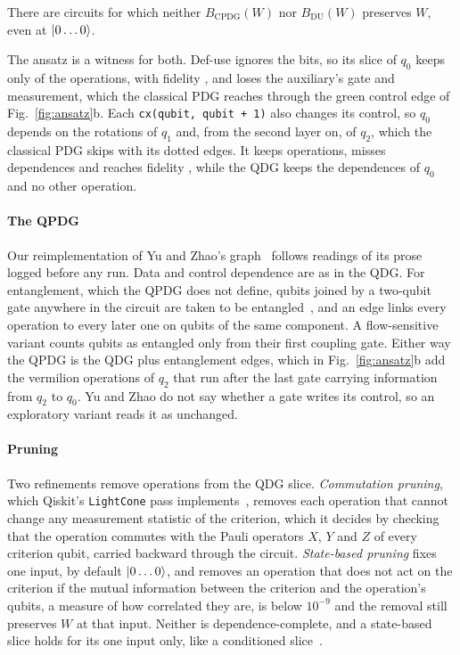 \begin{proposition}\label{prop:du}
There are circuits for which neither $B_{\mathrm{CPDG}}(W)$ nor $B_{\mathrm{DU}}(W)$ preserves $W$, even at
$\lvert 0\dots0\rangle$.
\end{proposition}

The ansatz is a witness for both. Def-use ignores the bits, so its slice of $q_0$ keeps only \numAnsDuOps{} of the
\numAnsOps{} operations, with fidelity \numAnsDuFidelity{}, and loses the auxiliary's gate and measurement, which the
classical PDG reaches through the green control edge of Fig.~\ref{fig:ansatz}b. Each \texttt{cx(qubit, qubit + 1)}
also changes its control, so $q_0$ depends on the rotations of $q_1$ and, from the second layer on, of $q_2$, which
the classical PDG skips with its dotted edges. It keeps \numAnsCpdgOps{} operations, misses \numAnsCpdgMissed{}
dependences and reaches fidelity \numAnsCpdgFidelity{}, while the QDG keeps the \numAnsWireOps{} dependences of $q_0$
and no other operation.

\paragraph*{The QPDG}
Our reimplementation of Yu and Zhao's graph~\cite{yu2025qpdg} follows readings of its prose logged before any run.
Data and control dependence are as in the QDG. For entanglement, which the QPDG does not define, qubits joined by a
two-qubit gate anywhere in the circuit are taken to be entangled~\cite{javadiabhari2015scaffcc}, and an edge links every operation
to every later one on qubits of the same component. A flow-sensitive variant counts qubits as entangled only from
their first coupling gate. Either way the QPDG is the QDG plus entanglement edges, which in Fig.~\ref{fig:ansatz}b
add the \numAnsYzExtra{} vermilion operations of $q_2$ that run after the last gate carrying information from $q_2$ to
$q_0$. Yu and Zhao do not say whether a gate writes its control, so an exploratory variant reads it as unchanged.

\paragraph*{Pruning}
Two refinements remove operations from the QDG slice. \emph{Commutation pruning}, which Qiskit's \texttt{LightCone}
pass implements~\cite{qiskit2025}, removes each operation that cannot change any measurement statistic of the criterion,
which it decides by checking that the operation commutes with the Pauli operators $X$, $Y$ and $Z$ of every criterion
qubit, carried backward through the circuit. \emph{State-based pruning} fixes one input, by default
$\lvert 0\dots0\rangle$, and removes an operation that does not act on the criterion if the mutual information between the
criterion and the operation's qubits, a measure of how correlated they are, is below $10^{-9}$ and the removal still preserves $W$ at that input. Neither is
dependence-complete, and a state-based slice holds for its one input only, like a conditioned
slice~\cite{canfora1998conditioned}.

